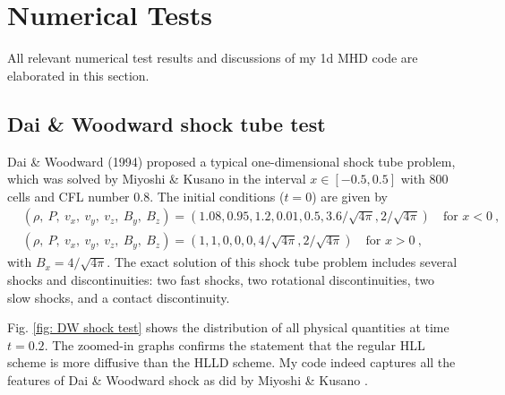 \documentclass[10.5pt]{article}
\begin{document}
\section{Numerical Tests}
All relevant numerical test results and discussions of my 1d MHD code are elaborated in 
this section.
\subsection{Dai \& Woodward shock tube test}
Dai \& Woodward (1994) \cite{DW1994} proposed a typical one-dimensional 
shock tube problem, which was solved by Miyoshi \& Kusano \cite{miyoshi2005multi}
in the interval $x\in[-0.5,0.5]$ with 800 cells and CFL number 
$0.8$. The initial conditions ($t=0$) are given by 
\begin{align}
&(\rho,\ P,\ v_x,\ v_y,\ v_z,\ B_y,\ B_z) = (1.08, 0.95, 1.2, 0.01, 0.5, 3.6/\sqrt{4 \pi}, 2/\sqrt{4\pi}) \quad
\text{for } x<0 \ , \\
&(\rho,\ P,\ v_x,\ v_y,\ v_z,\ B_y,\ B_z) = (1, 1, 0, 0, 0, 4/\sqrt{4 \pi}, 2/\sqrt{4\pi}) \quad
\text{for } x>0  \ , 
\end{align}
with $B_x = 4/\sqrt{4\pi}$.
The exact solution of this shock tube problem includes several shocks and discontinuities: 
two fast shocks, two rotational discontinuities, two slow shocks, and a contact discontinuity.

Fig. \ref{fig: DW shock test} shows the distribution of all physical quantities at time $t=0.2$. 
The zoomed-in graphs confirms the statement that the regular HLL scheme is more diffusive than 
the HLLD scheme. My code indeed captures all the features of Dai \& Woodward shock 
as did by Miyoshi \& Kusano \cite{miyoshi2005multi}.
\end{document}
